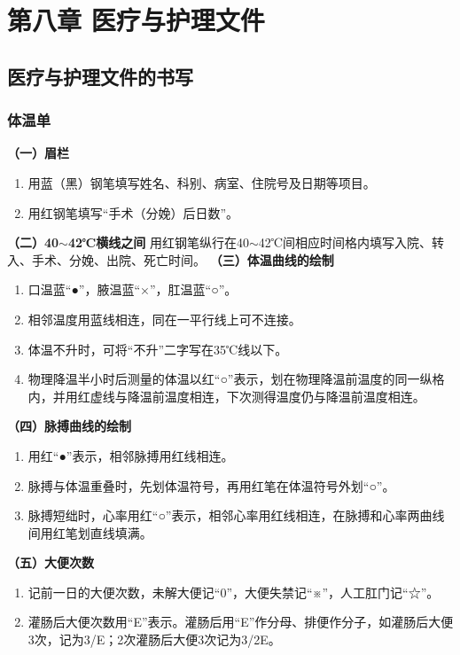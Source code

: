 \documentclass[11pt, a4paper]{ctexart}
\begin{document}
\section{第八章 医疗与护理文件}
\subsection{医疗与护理文件的书写}
\subsubsection{体温单}
\textbf{（一）眉栏}
\begin{enumerate}
	\item 用蓝（黑）钢笔填写姓名、科别、病室、住院号及日期等项目。
	\item 用红钢笔填写“手术（分娩）后日数”。
\end{enumerate}
\textbf{（二）40$\sim$42℃横线之间}
用红钢笔纵行在40$\sim$42℃间相应时间格内填写入院、转入、手术、分娩、出院、死亡时间。
\textbf{（三）体温曲线的绘制}
\begin{enumerate}
	\item 口温蓝“●”，腋温蓝“×”，肛温蓝“○”。
	\item 相邻温度用蓝线相连，同在一平行线上可不连接。
	\item 体温不升时，可将“不升”二字写在35℃线以下。
	\item 物理降温半小时后测量的体温以红“○”表示，划在物理降温前温度的同一纵格内，并用红虚线与降温前温度相连，下次测得温度仍与降温前温度相连。
\end{enumerate}
\textbf{（四）脉搏曲线的绘制}
\begin{enumerate}
	\item 用红“●”表示，相邻脉搏用红线相连。
	\item 脉搏与体温重叠时，先划体温符号，再用红笔在体温符号外划“○”。
	\item 脉搏短绌时，心率用红“○”表示，相邻心率用红线相连，在脉搏和心率两曲线间用红笔划直线填满。
\end{enumerate}
\textbf{（五）大便次数}
\begin{enumerate}
	\item 记前一日的大便次数，未解大便记“0”，大便失禁记“※”，人工肛门记“☆”。
	\item 灌肠后大便次数用“E”表示。灌肠后用“E”作分母、排便作分子，如灌肠后大便3次，记为3/E；2次灌肠后大便3次记为3/2E。
\end{enumerate}
\end{document}
